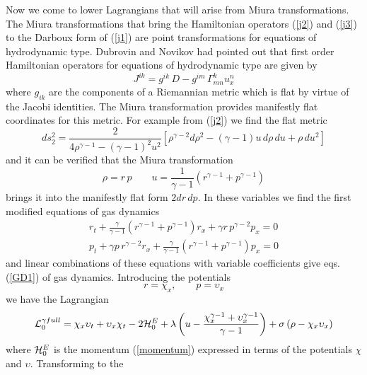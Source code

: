 \documentclass[a4paper,12pt]{article}
\begin{document}
Now we come to lower Lagrangians that will arise from Miura
transformations. The Miura transformations that bring the
Hamiltonian operators (\ref{j2}) and (\ref{j3}) to the Darboux
form of (\ref{j1}) are point transformations for equations of
hydrodynamic type. Dubrovin and Novikov had pointed out that first
order Hamiltonian operators for equations of hydrodynamic type are
given by
\begin{equation}
J^{ik} = g^{ik} \, D - g^{im} \, \Gamma^k_{mn} u^n_x \label{dnop}
\end{equation}
where $g_{ik}$ are the components of a Riemannian metric which is
flat by virtue of the Jacobi identities. The Miura transformation
provides manifestly flat coordinates for this metric. For example
from (\ref{j2}) we find the flat metric
\begin{equation}
d s_2^2  =  \frac{2}{4 \rho^{\gamma-1} - (\gamma-1)^2 u^2} \left[
\rho^{\gamma-2} d \rho^2 - (\gamma-1) u \, d \rho \, d u + \rho \,
          d u^2 \right] \label{metrics}
\end{equation}
and it can be verified that the Miura transformation
\begin{equation}
\rho  =  r \, p  \qquad u = \frac{1}{\gamma-1} \left( r^{\gamma-1}
+ p^{\gamma-1} \right)
\end{equation}
brings it into the manifestly flat form $ 2 d r \, d p$. In these
variables we find the first modified equations of gas dynamics
\begin{eqnarray}
r_t + \frac{\gamma}{\gamma-1} (r^{\gamma-1} + p^{\gamma-1}) r_x +
\gamma r \, p^{\gamma-2} p_x =0 \label{modgas1} \\
p_t + \gamma p \, r^{\gamma-2} r_x+ \frac{\gamma}{\gamma-1}
(r^{\gamma-1} + p^{\gamma-1}) p_x =0  \nonumber
\end{eqnarray}
and linear combinations of these equations with variable
coefficients give eqs.(\ref{GD1}) of gas dynamics. Introducing the
potentials
\begin{equation} r = \chi_x , \qquad p   = \upsilon_x
\end{equation}
we have the Lagrangian
\begin{equation}
{\cal L}_{0}^{\gamma full} =   \chi_{x} \upsilon_{t} +\upsilon_{x}
\chi_{t} - 2 {\cal H}_0^E + \lambda \left( u - \frac{
\chi_x^{\gamma-1} + \upsilon_x^{\gamma-1}}{\gamma-1} \right) +
\sigma \left( \rho - \chi_x \upsilon_x \right) \label{lag0gd}
\end{equation}
where ${\cal H}_0^E$ is the momentum (\ref{momentum}) expressed in
terms of the potentials $\chi$ and $\upsilon$. Transforming to the
\end{document}
